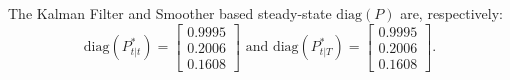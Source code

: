 \documentclass[a4paper,12pt]{article}
\begin{document}
The Kalman Filter and Smoother based steady-state $\mathrm{diag}(P)$ are,
respectively:%
\begin{equation}
\mathrm{diag}(P_{t|t}^{\ast })=%
\begin{bmatrix}
0.9995 \\ 
0.2006 \\ 
0.1608%
\end{bmatrix}%
\text{ \ and \ }\mathrm{diag}(P_{t|T}^{\ast })=%
\begin{bmatrix}
0.9995 \\ 
0.2006 \\ 
0.1608%
\end{bmatrix}%
.
\end{equation}
\end{document}
